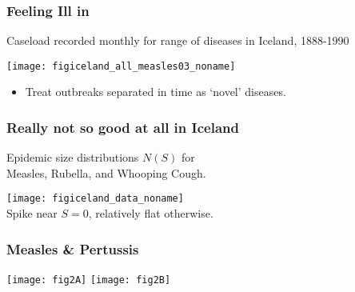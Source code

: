 
\begin{frame}
  \frametitle{Feeling Ill in }
 
 
   Caseload recorded monthly for range of diseases in Iceland, 1888-1990

   \bigskip
 
   \texttt{[image: figiceland\_all\_measles03\_noname]}

   \begin{itemize}
   \item Treat outbreaks separated in time as `novel' diseases.
   \end{itemize}
   
 
 
 

 
\end{frame}

\begin{frame}
  \frametitle{Really not so good at all in Iceland}


  Epidemic size distributions $N(S)$ for \\ Measles, Rubella, and Whooping Cough.

  \bigskip

  \texttt{[image: figiceland\_data\_noname]}\\

  Spike near $S=0$, relatively flat otherwise.

  
\end{frame}


\begin{frame}
  \frametitle{Measles \& Pertussis}

  \texttt{[image: fig2A]} 
  \texttt{[image: fig2B]} 
  


\end{frame}


